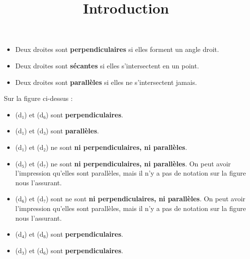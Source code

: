 \documentclass[a4paper,11pt]{article}
\title{Introduction}
\date{}
\author{}
\begin{document}
\maketitle

\begin{vocabulaire}[(Rappel)]
	\begin{itemize}
		\item Deux droites sont \textbf{perpendiculaires} si elles forment un angle droit.
		\item Deux droites sont \textbf{sécantes} si elles s'intersectent en un point.
		\item Deux droites sont \textbf{parallèles} si elles ne s'intersectent jamais.
	\end{itemize}
\end{vocabulaire}

\begin{center}
\end{center}

Sur la figure ci-dessus :
\begin{itemize}
	\item (d₁) et (d₆) sont \textbf{perpendiculaires}.
	\item (d₁) et (d₃) sont \textbf{parallèles}.
	\item (d₁) et (d₂) ne sont \textbf{ni perpendiculaires, ni parallèles}.
	\item (d₅) et (d₇) ne sont \textbf{ni perpendiculaires, ni parallèles}. On peut avoir l'impression qu'elles sont parallèles, mais il n'y a pas de notation sur la figure nous l'assurant.
	\item (d₆) et (d₇) sont ne sont \textbf{ni perpendiculaires, ni parallèles}. On peut avoir l'impression qu'elles sont parallèles, mais il n'y a pas de notation sur la figure nous l'assurant.
	\item (d₄) et (d₈) sont \textbf{perpendiculaires}.
	\item (d₃) et (d₆) sont \textbf{perpendiculaires}.
\end{itemize}
\end{document}
